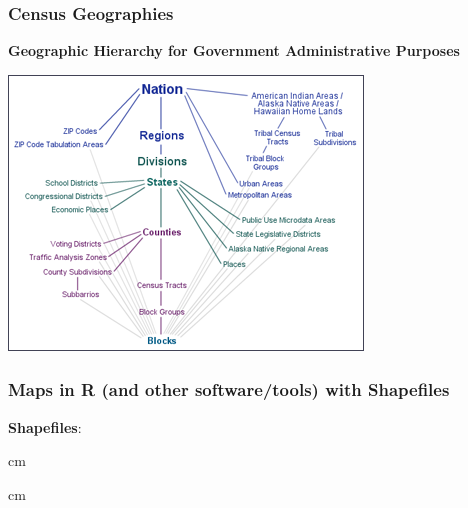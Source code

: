 \documentclass{beamer} %
\begin{document}
\begin{frame}\frametitle{Census Geographies}
	\small
	
	\centering
	
	\textbf{Geographic Hierarchy for Government Administrative Purposes}  %
	
	\includegraphics[width=0.8\linewidth]{census-geographic-hierarchy.png}
\end{frame}




\begin{frame}\frametitle{Maps in R (and other software/tools) with Shapefiles}
	\small
	
	\textbf{Shapefiles}:  
	
	
	 cm
	
	
	
	 cm
	
\end{frame}
\end{document}
